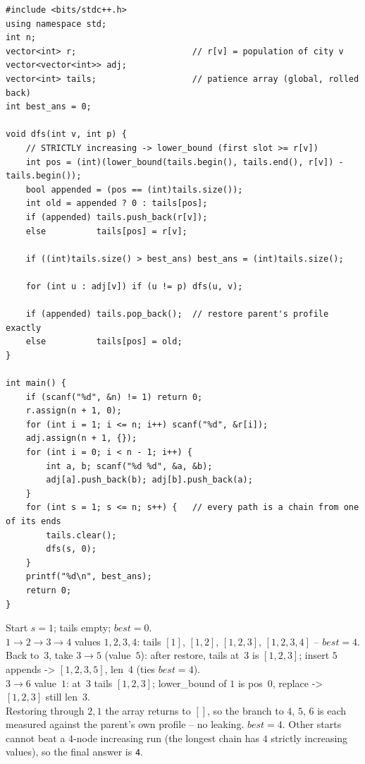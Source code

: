 \begin{lstlisting}[caption={Codeforces 490F -- enumerate the start vertex, run the rollback patience profile of \coderef{c27-profile} once per start}, label={lst:c27-490f-soln}]
#include <bits/stdc++.h>
using namespace std;
int n;
vector<int> r;                       // r[v] = population of city v
vector<vector<int>> adj;
vector<int> tails;                   // patience array (global, rolled back)
int best_ans = 0;

void dfs(int v, int p) {
    // STRICTLY increasing -> lower_bound (first slot >= r[v])
    int pos = (int)(lower_bound(tails.begin(), tails.end(), r[v]) - tails.begin());
    bool appended = (pos == (int)tails.size());
    int old = appended ? 0 : tails[pos];
    if (appended) tails.push_back(r[v]);
    else          tails[pos] = r[v];

    if ((int)tails.size() > best_ans) best_ans = (int)tails.size();

    for (int u : adj[v]) if (u != p) dfs(u, v);

    if (appended) tails.pop_back();  // restore parent's profile exactly
    else          tails[pos] = old;
}

int main() {
    if (scanf("%d", &n) != 1) return 0;
    r.assign(n + 1, 0);
    for (int i = 1; i <= n; i++) scanf("%d", &r[i]);
    adj.assign(n + 1, {});
    for (int i = 0; i < n - 1; i++) {
        int a, b; scanf("%d %d", &a, &b);
        adj[a].push_back(b); adj[b].push_back(a);
    }
    for (int s = 1; s <= n; s++) {   // every path is a chain from one of its ends
        tails.clear();
        dfs(s, 0);
    }
    printf("%d\n", best_ans);
    return 0;
}
\end{lstlisting}

\begin{tracebox}[Official Example~1: $n=6$, $r=(1,2,3,4,5,1)$, edges $1\text{--}2,2\text{--}3,3\text{--}4,3\text{--}5,3\text{--}6$ $\Rightarrow$ 4]
Start $s=1$; tails empty; $\mathit{best}=0$.\\
$1\!\to\!2\!\to\!3\!\to\!4$ values $1,2,3,4$: tails $[1]$, $[1,2]$, $[1,2,3]$,
$[1,2,3,4]$ -- $\mathit{best}=4$.\\
Back to~$3$, take $3\!\to\!5$ (value~$5$): after restore, tails at~$3$ is $[1,2,3]$;
insert $5$ appends -> $[1,2,3,5]$, len~4 (ties $\mathit{best}=4$).\\
$3\!\to\!6$ value~$1$: at~$3$ tails $[1,2,3]$; lower\_bound of $1$ is pos~0,
replace -> $[1,2,3]$ still len~3.\\
Restoring through $2,1$ the array returns to $[]$, so the branch to $4$, $5$, $6$
is each measured against the parent's own profile -- no leaking. $\mathit{best}=4$.
Other starts cannot beat a $4$-node increasing run (the longest chain has $4$ strictly
increasing values), so the final answer is \texttt{4}. \checkmark
\end{tracebox}

